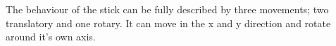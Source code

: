 		The behaviour of the stick can be fully described by three movements; two translatory and one rotary. It can move in the x and y direction and rotate around it's own axis.
		
		

